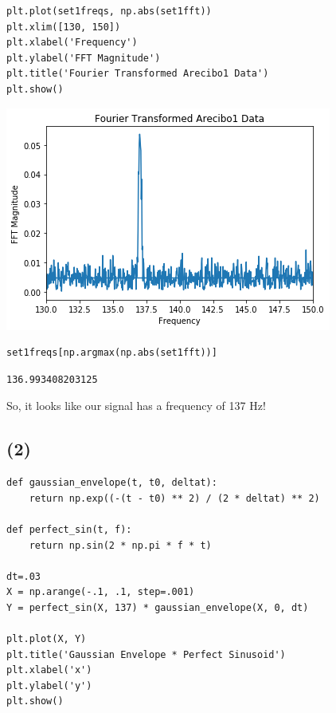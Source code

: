 \documentclass[11pt]{article}
\begin{document}
\begin{verbatim}
plt.plot(set1freqs, np.abs(set1fft))
plt.xlim([130, 150])
plt.xlabel('Frequency')
plt.ylabel('FFT Magnitude')
plt.title('Fourier Transformed Arecibo1 Data')
plt.show()
\end{verbatim}

\includegraphics[width=.9\linewidth]{./obipy-resources/17087VQd.png}

\begin{verbatim}
set1freqs[np.argmax(np.abs(set1fft))]
\end{verbatim}

\begin{verbatim}
136.993408203125
\end{verbatim}


So, it looks like our signal has a frequency of 137 Hz!

\subsection*{(2)}
\label{sec-2-2}

\begin{verbatim}
def gaussian_envelope(t, t0, deltat):
    return np.exp((-(t - t0) ** 2) / (2 * deltat) ** 2)

def perfect_sin(t, f):
    return np.sin(2 * np.pi * f * t)

dt=.03
X = np.arange(-.1, .1, step=.001)
Y = perfect_sin(X, 137) * gaussian_envelope(X, 0, dt)

plt.plot(X, Y)
plt.title('Gaussian Envelope * Perfect Sinusoid')
plt.xlabel('x')
plt.ylabel('y')
plt.show()
\end{verbatim}
\end{document}
